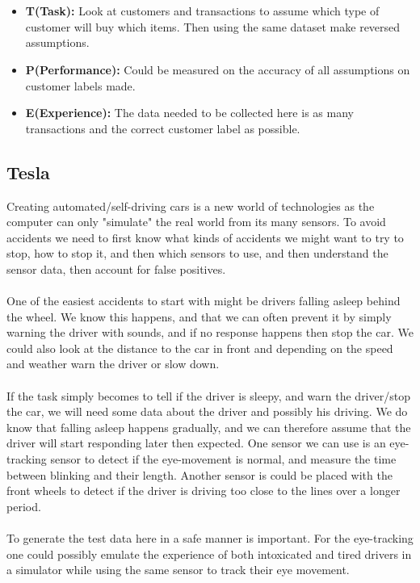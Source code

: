 \documentclass[a4paper, 12pt]{article}
\newcommand{\mysubsection}[1]{\subsection*{#1} \addcontentsline{toc}{subsection}{#1}}
\begin{document}
    \\\\
    \begin{itemize}
    \item \textbf{T(Task):} Look at customers and transactions to assume which type of customer will buy which items. Then using the same dataset make reversed assumptions.
    \item \textbf{P(Performance):} Could be measured on the accuracy of all assumptions on customer labels made.
    \item \textbf{E(Experience):} The data needed to be collected here is as many transactions and the correct customer label as possible.
    \end{itemize}
    
    \mysubsection{Tesla}
    Creating automated/self-driving cars is a new world of technologies as the computer can only "simulate" the real world from its many sensors. To avoid accidents we need to first know what kinds of accidents we might want to try to stop, how to stop it, and then which sensors to use, and then understand the sensor data, then account for false positives.
    \\\\
    One of the easiest accidents to start with might be drivers falling asleep behind the wheel. We know this happens, and that we can often prevent it by simply warning the driver with sounds, and if no response happens then stop the car. We could also look at the distance to the car in front and depending on the speed and weather warn the driver or slow down.
    \\\\
    If the task simply becomes to tell if the driver is sleepy, and warn the driver/stop the car, we will need some data about the driver and possibly his driving. We do know that falling asleep happens gradually, and we can therefore assume that the driver will start responding later then expected. One sensor we can use is an eye-tracking sensor to detect if the eye-movement is normal, and measure the time between blinking and their length. Another sensor is could be placed with the front wheels to detect if the driver is driving too close to the lines over a longer period.
    \\\\
    To generate the test data here in a safe manner is important. For the eye-tracking one could possibly emulate the experience of both intoxicated and tired drivers in a simulator while using the same sensor to track their eye movement.
\end{document}
